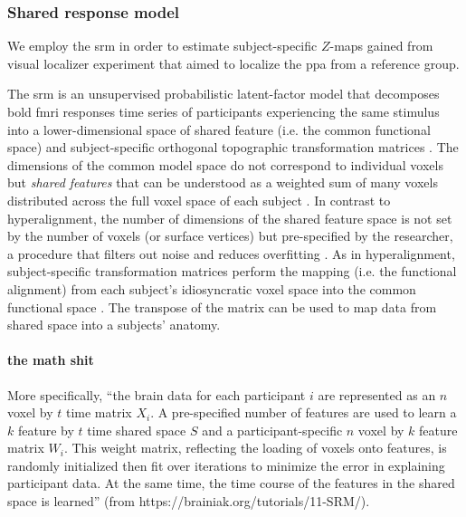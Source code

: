 \subsubsection{Shared response model}

%
We employ the \ac{srm} \citep{chen2015reduced, richard2019fast} in order to
estimate subject-specific $Z$-maps gained from visual localizer experiment that
aimed to localize the \ac{ppa} from a reference group.

%
The \ac{srm} is an unsupervised probabilistic latent-factor model that
decomposes \ac{bold} \ac{fmri} responses time series of participants
experiencing the same stimulus into a lower-dimensional space of shared feature
(i.e. the common functional space) and subject-specific orthogonal topographic
transformation matrices \citep{kumar2020brainiak, cohen2017computational}.
%
The dimensions of the common model space do not correspond to individual voxels
but \textit{shared features} that can be understood as a weighted sum of many
voxels distributed across the full voxel space of each subject
\citep{kumar2020brainiak}.
%
In contrast to hyperalignment, the number of dimensions of the shared feature
space is not set by the number of voxels (or surface vertices) but pre-specified
by the researcher, a procedure that filters out noise and reduces overfitting
\citep{chen2015reduced}.
%
As in hyperalignment, subject-specific transformation matrices perform the
mapping (i.e. the functional alignment) from each subject's idiosyncratic voxel
space into the common functional space \citep{kumar2020brainiak,
cohen2017computational}.
The transpose of the matrix can be used to map data from shared space into a
subjects' anatomy.


\paragraph{the math shit}


%
More specifically, ``the brain data for each participant $i$ are represented as
an \textbf{$n$} voxel by $t$ time matrix  $X_{i}$. A pre-specified number of
features are used to learn a $k$ feature by  $t$ time shared space $S$ and a
participant-specific $n$ voxel by $k$  feature matrix $W_{i}$. This weight
matrix, reflecting the loading of voxels onto features, is randomly initialized
then fit over iterations to minimize the error in explaining participant data.
At the same time, the time course of the features in the shared space is
learned'' (from https://brainiak.org/tutorials/11-SRM/).

